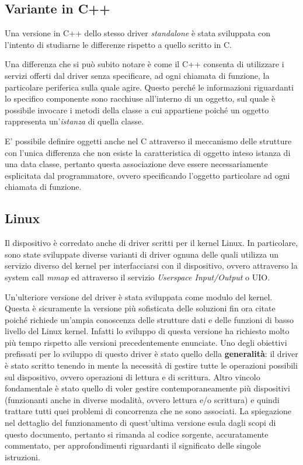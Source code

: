 \documentclass[12pt,a4paper,twoside,openany]{book}
\begin{document}
\subsection*{Variante in C++}
Una versione in C++ dello stesso driver \textit{standalone} è stata sviluppata con l'intento di studiarne le differenze rispetto a quello scritto in C.
 
Una differenza che si può subito notare è come il C++ consenta di utilizzare i servizi offerti dal driver senza specificare, ad ogni chiamata di funzione,  la particolare periferica sulla quale agire. 
Questo perché le informazioni riguardanti lo specifico componente sono racchiuse all'interno di un oggetto, sul quale è possibile invocare i metodi della classe a cui appartiene poiché un oggetto rappresenta un'\textit{istanza} di quella classe.

E' possibile definire oggetti anche nel C attraverso il meccanismo delle strutture con l'unica differenza che non esiste la caratteristica di oggetto inteso istanza di una data classe, pertanto questa associazione deve essere necessariamente esplicitata dal programmatore, ovvero specificando l'oggetto particolare ad ogni chiamata di funzione. 

\subsection*{Linux}
Il dispositivo è corredato anche di driver scritti per il kernel Linux. In particolare, sono state sviluppate diverse varianti di driver ognuna delle quali utilizza un servizio diverso del kernel per interfacciarsi con il dispositivo, ovvero attraverso la system call \textit{mmap} ed attraverso  il servizio \textit{Userspace Input/Output} o UIO.

Un'ulteriore versione del driver è stata sviluppata come modulo del kernel. Questa è sicuramente la versione più sofisticata delle soluzioni fin ora citate poiché richiede un'ampia conoscenza delle strutture dati e delle funzioni di basso livello del Linux kernel. Infatti lo sviluppo di questa versione ha richiesto molto più tempo rispetto alle versioni precedentemente enunciate.
Uno degli obiettivi prefissati per lo sviluppo di questo driver è stato quello della \textbf{generalità}: il driver è stato scritto tenendo in mente la necessità di gestire tutte le operazioni possibili sul dispositivo, ovvero operazioni di lettura e di scrittura. 
Altro vincolo fondamentale è stato quello di voler gestire contemporaneamente più dispositivi (funzionanti anche in diverse modalità, ovvero lettura e/o scrittura) e quindi trattare tutti quei problemi di concorrenza che ne sono associati.
La spiegazione nel dettaglio del funzionamento di quest'ultima versione esula dagli scopi di questo documento, pertanto si rimanda al codice sorgente, accuratamente commentato, per approfondimenti riguardanti il significato delle singole istruzioni.
\end{document}
